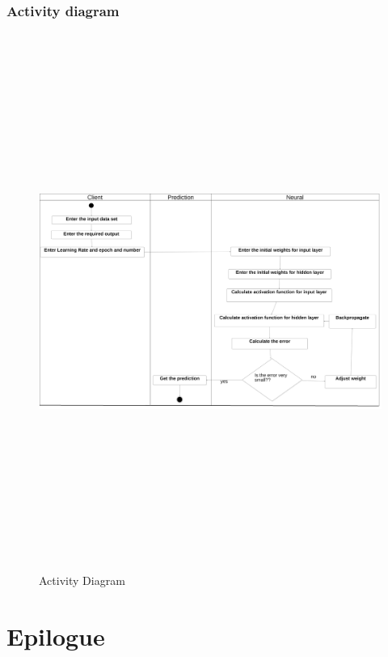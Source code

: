 \subsection{Activity diagram}
\begin{figure}[H]
\begin{center}
    
\includegraphics[width=160mm,height=175mm]{images/activity.png}
 \caption{Activity Diagram}
 \end{center}                
\end{figure}


\chapter{Epilogue}

